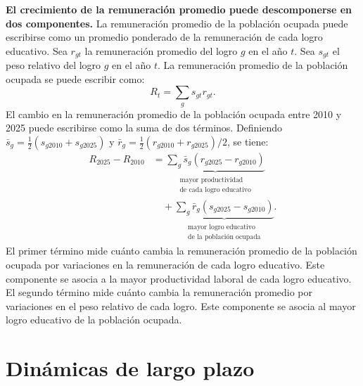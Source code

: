 \textbf{El crecimiento de la remuneración promedio puede descomponerse en dos componentes.} La remuneración promedio de la población ocupada puede escribirse como un promedio ponderado de la remuneración de cada logro educativo. Sea \(r_{gt}\)   la remuneración promedio del logro \(g\) en el año \(t\). Sea \(s_{gt}\) el peso relativo del logro \(g\) en el año \(t\). La remuneración promedio de la población ocupada se puede escribir como:
\begin{equation}\label{eq:remuneracion_promedio_educacion}
R_t = \sum_g s_{gt} r_{gt}.
\end{equation}
El cambio en la remuneración promedio de la población ocupada entre 2010 y 2025 puede escribirse como la suma de dos términos. Definiendo \(\bar{s}_g=\frac{1}{2}(s_{g2010}+s_{g2025})\) y \(\bar{r}_g=\frac{1}{2}(r_{g2010}+r_{g2025})/2\), se tiene:
\begin{equation}\label{eq:descomposicion_educacion}
\begin{aligned}
R_{2025}-R_{2010}
&=
\underbrace{\sum_g \bar{s}_g \left(r_{g2025}-r_{g2010}\right)}_{\substack{\text{mayor productividad}\\\text{de cada logro educativo}}} \\
&\quad +
\underbrace{\sum_g \bar{r}_g \left(s_{g2025}-s_{g2010}\right)}_{\substack{\text{mayor logro educativo}\\\text{de la población ocupada}}}.
\end{aligned}
\end{equation}
El primer término mide cuánto cambia la remuneración promedio de la población ocupada por variaciones en la remuneración de cada logro educativo. Este componente se asocia a la mayor productividad laboral de cada logro educativo. El segundo término mide cuánto cambia la remuneración promedio por variaciones en el peso relativo de cada logro. Este componente se asocia al mayor logro educativo de la población ocupada. %

\section{Dinámicas de largo plazo}\label{sec:grupos_comparables}

